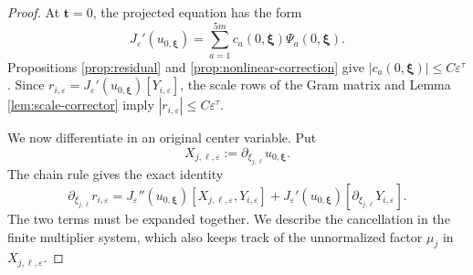 \documentclass[11pt]{article}
\numberwithin{equation}{section}
\begin{document}
\begin{proof}
At $\boldsymbol t=0$, the projected equation has the form
\begin{equation}\label{eq:scale-defect-projected-equation}
J_\varepsilon'(u_{0,\boldsymbol\xi})
=\sum_{a=1}^{5m}c_a(0,\boldsymbol\xi)
\Psi_a(0,\boldsymbol\xi).
\end{equation}
Propositions \ref{prop:residual} and
\ref{prop:nonlinear-correction} give
$|c_a(0,\boldsymbol\xi)|\leq C\varepsilon^\tau$. Since
$r_{i,\varepsilon}=J_\varepsilon'(u_{0,\boldsymbol\xi})
[Y_{i,\varepsilon}]$, the scale rows of the Gram matrix and Lemma
\ref{lem:scale-corrector} imply
$|r_{i,\varepsilon}|\leq C\varepsilon^\tau$.

We now differentiate in an original center variable. Put
\[
X_{j,\ell,\varepsilon}
:=\partial_{\xi_{j,\ell}}u_{0,\boldsymbol\xi}.
\]
The chain rule gives the exact identity
\begin{equation*}
\partial_{\xi_{j,\ell}}r_{i,\varepsilon}
=J_\varepsilon''(u_{0,\boldsymbol\xi})
[X_{j,\ell,\varepsilon},Y_{i,\varepsilon}]
+J_\varepsilon'(u_{0,\boldsymbol\xi})
[\partial_{\xi_{j,\ell}}Y_{i,\varepsilon}].
\end{equation*}
The two terms must be expanded together. We describe the cancellation
in the finite multiplier system, which also keeps track of the
unnormalized factor $\mu_j$ in $X_{j,\ell,\varepsilon}$.


\end{proof}
\end{document}
